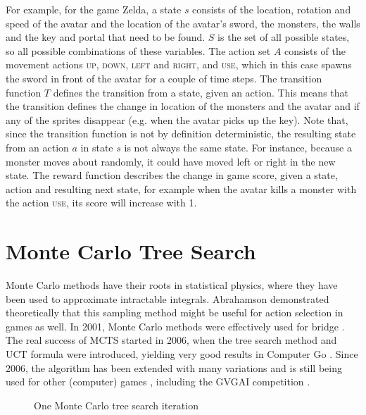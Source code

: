 For example, for the game Zelda, a state $s$ consists of the location, rotation
and speed of the avatar and the location of the avatar's sword, the monsters, the
walls and the key and portal that need to be found. $S$ is the set of all
possible states, so all possible combinations of these variables. The action set
$A$ consists of the movement actions \textsc{up}, \textsc{down}, \textsc{left}
and \textsc{right}, and \textsc{use}, which in this case spawns the sword in
front of the avatar for a couple of time steps. The transition function $T$
defines the transition from a state, given an action.  This means that the
transition defines the change in location of the monsters and the avatar and if
any of the sprites disappear (e.g. when the avatar picks up the key). Note that,
since the transition function is not by definition deterministic, the resulting
state from an action $a$ in state $s$ is not always the same state. For
instance, because a monster moves about randomly, it could have moved left or
right in the new state. The reward function describes the change in game score,
given a state, action and resulting next state, for example when the avatar
kills a monster with the action \textsc{use}, its score will increase with 1.

\section{Monte Carlo Tree Search}
\label{subsec:mcts}
Monte Carlo methods have their roots in statistical physics, where they have
been used to approximate intractable integrals. Abrahamson
\cite{abramson1990expected} demonstrated theoretically that this sampling method
might be useful for action selection in games as well.  In 2001, Monte Carlo
methods were effectively used for bridge \cite{ginsberg2001gib}. The real
success of MCTS started in 2006, when the tree search method and UCT formula
were introduced, yielding very good results in Computer Go
\cite{gelly2006modification}. Since 2006, the algorithm has been extended with
many variations and is still being used for other (computer) games
\cite{browne2012survey}, including the GVGAI competition
\cite{perez2014knowledge}.

\begin{figure}
	\centering
	\caption{One Monte Carlo tree search iteration}
	\label{fig:mcts}
\end{figure}

